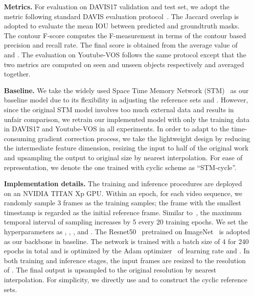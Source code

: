 \documentclass{article}
\begin{document}
\textbf{Metrics.} For evaluation on DAVIS17 validation and test set, we adopt the metric following standard DAVIS evaluation protocol~\cite{Pont-Tuset_arXiv_2017}. The Jaccard overlap  is adopted to evaluate the mean IOU between predicted and groundtruth masks. The contour F-score  computes the F-measurement in terms of the contour based precision and recall rate. The final score is obtained from the average value of  and . The evaluation on Youtube-VOS follows the same protocol except that the two metrics are computed on seen and unseen objects respectively and averaged together.

\textbf{Baseline.} We take the widely used Space Time Memory Network (STM)~\cite{Oh_2019_ICCV} as our baseline model due to its flexibility in adjusting the reference sets  and . However, since the original STM model involves too much external data and results in unfair comparison, we retrain our implemented model with only the training data in DAVIS17 and Youtube-VOS in all experiments. In order to adapt to the time-consuming gradient correction process, we take the lightweight design by reducing the intermediate feature dimension, resizing the input to half of the original work and upsampling the output to original size by nearest interpolation. For ease of representation, we denote the one trained with cyclic scheme as ``STM-cycle''.

\textbf{Implementation details.} The training and inference procedures are deployed on an NVIDIA TITAN Xp GPU. Within an epoch, for each video sequence, we randomly sample 3 frames as the training samples; the frame with the smallest timestamp is regarded as the initial reference frame. Similar to~\cite{Oh_2019_ICCV}, the maximum temporal interval of sampling increases by 5 every 20 training epochs. We set the hyperparameters as , , , and . The Resnet50~\cite{He_2016_CVPR} pretrained on ImageNet~\cite{imagenet_cvpr09} is adopted as our backbone in baseline. The network is trained with a batch size of 4 for 240 epochs in total and is optimized by the Adam optimizer~\cite{adam2014method} of learning rate  and . In both training and inference stages, the input frames are resized to the resolution of . The final output is upsampled to the original resolution by nearest interpolation. For simplicity, we directly use  and  to construct the cyclic reference sets. 
\end{document}
